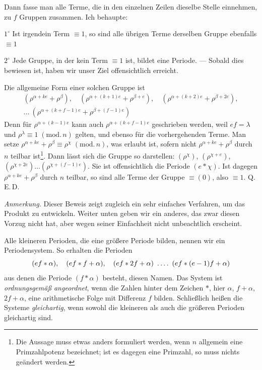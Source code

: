 Dann fasse man alle Terme, die in den einzelnen Zeilen dieselbe Stelle einnehmen, zu $f$ Gruppen zusammen. Ich behaupte:
\par\noindent $1^\circ$ Ist irgendein Term $\equiv1$, so sind alle übrigen Terme derselben Gruppe ebenfalls $\equiv1$

\noindent $2^\circ$ Jede Gruppe, in der kein Term $\equiv1$ ist, bildet eine Periode. --- Sobald dies bewiesen ist, haben wir unser Ziel offensichtlich erreicht.

Die allgemeine Form einer solchen Gruppe ist
\[
\begin{gathered}
(\rho^{\alpha+ke}+\rho^\beta),\quad(\rho^{\alpha+(k+1)e}+\rho^{\beta+e}),\quad(\rho^{\alpha+(k+2)e}+\rho^{\beta+2e}),\\
\ldots\ (\rho^{\alpha+(k+f-1)e}+\rho^{\beta+(f-1)e})
\end{gathered}
\]
Denn für $\rho^{\alpha+(k-1)e}$ kann auch $\rho^{\alpha+(k+f-1)e}$ geschrieben werden, weil $ef=\lambda$ und $\rho^\lambda\equiv1\;(\mathrm{mod.}\,n)$ gelten, und ebenso für die vorhergehenden Terme. Man setze $\rho^{\alpha+ke}+\rho^\beta\equiv\rho^\chi\;(\mathrm{mod.}\,n)$, was erlaubt ist, sofern nicht $\rho^{\alpha+ke}+\rho^\beta$ durch $n$ teilbar ist\begingroup\renewcommand{\thefootnote}{*)}\footnote{Die Aussage muss etwas anders formuliert werden, wenn $n$ allgemein eine Primzahlpotenz bezeichnet; ist es dagegen eine Primzahl, so muss nichts geändert werden.}\endgroup. Dann lässt sich die Gruppe so darstellen: $(\rho^\chi)$, $(\rho^{\chi+e})$, $(\rho^{\chi+2e})\ldots(\rho^{\chi+(f-1)e})$. Sie ist offensichtlich die Periode $(e\ast\chi)$. Ist dagegen $\rho^{\alpha+ke}+\rho^\beta$ durch $n$ teilbar, so sind alle Terme der Gruppe $\equiv(0)$, also $\equiv1$. Q.\,E.\,D.

\emph{Anmerkung.} Dieser Beweis zeigt zugleich ein sehr einfaches Verfahren, um das Produkt zu entwickeln. Weiter unten geben wir ein anderes, das zwar diesen Vorzug nicht hat, aber wegen seiner Einfachheit nicht unbeachtlich erscheint.

Alle kleineren Perioden, die eine größere Periode bilden, nennen wir ein Periodensystem. So erhalten die Perioden
\[
(ef\ast\alpha),\quad(ef\ast f+\alpha),\quad(ef\ast2f+\alpha)\ \dotsfour\ (ef\ast(e-1)f+\alpha)
\]
aus denen die Periode $(f\ast\alpha)$ besteht, diesen Namen. Das System ist \emph{ordnungsgemäß angeordnet}, wenn die Zahlen hinter dem Zeichen $\ast$, hier $\alpha$, $f+\alpha$, $2f+\alpha$, eine arithmetische Folge mit Differenz $f$ bilden. Schließlich heißen die Systeme \emph{gleichartig}, wenn sowohl die kleineren als auch die größeren Perioden gleichartig sind.

